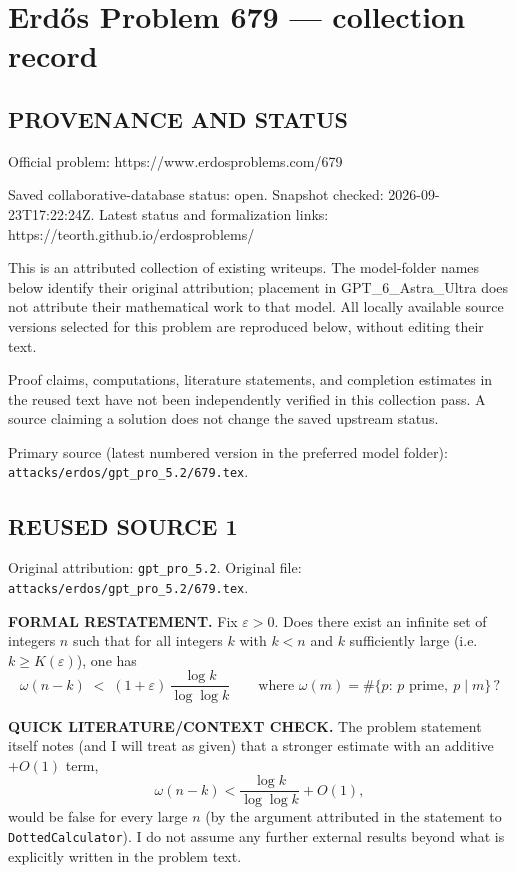 \section*{Erd\H{o}s Problem 679 --- collection record}

\subsection*{PROVENANCE AND STATUS}
Official problem: https://www.erdosproblems.com/679

Saved collaborative-database status: open.
Snapshot checked: 2026-09-23T17:22:24Z.
Latest status and formalization links: https://teorth.github.io/erdosproblems/

This is an attributed collection of existing writeups. The model-folder names below identify their original attribution; placement in GPT\_6\_Astra\_Ultra does not attribute their mathematical work to that model. All locally available source versions selected for this problem are reproduced below, without editing their text.

Proof claims, computations, literature statements, and completion estimates in the reused text have not been independently verified in this collection pass. A source claiming a solution does not change the saved upstream status.

Primary source (latest numbered version in the preferred model folder): \texttt{attacks/erdos/gpt\_pro\_5.2/679.tex}.

\subsection*{REUSED SOURCE 1}
Original attribution: \texttt{gpt\_pro\_5.2}.
Original file: \texttt{attacks/erdos/gpt\_pro\_5.2/679.tex}.

\item
\textbf{FORMAL RESTATEMENT.}
Fix $\varepsilon>0$. Does there exist an infinite set of integers $n$ such that for all integers $k$ with $k<n$ and $k$ sufficiently large (i.e. $k\ge K(\varepsilon)$), one has
\[
\omega(n-k)\;<\;(1+\varepsilon)\,\frac{\log k}{\log\log k}
\qquad\text{where }\omega(m)=\#\{p:\,p\text{ prime},\ p\mid m\}\,?
\]

\textbf{QUICK LITERATURE/CONTEXT CHECK.}
The problem statement itself notes (and I will treat as given) that a stronger estimate with an additive $+O(1)$ term,
\[\omega(n-k) < \frac{\log k}{\log\log k} + O(1),\]
would be false for every large $n$ (by the argument attributed in the statement to \texttt{DottedCalculator}). I do not assume any further external results beyond what is explicitly written in the problem text.

